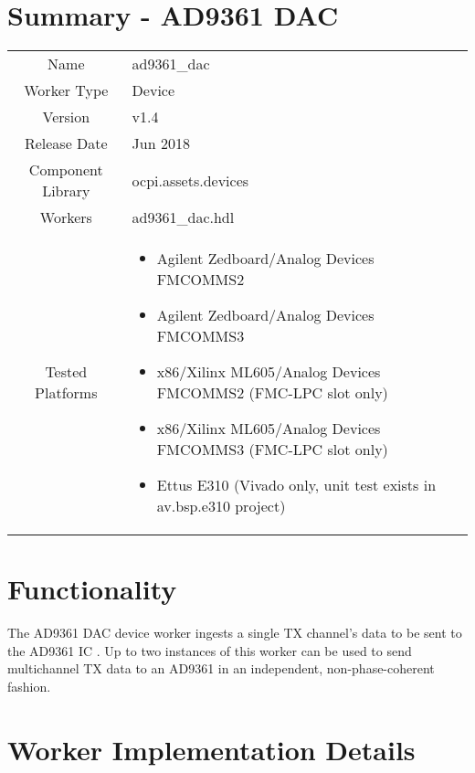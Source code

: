 \documentclass{article}
\author{} %
\date{Version \docVersion} %
\title{\docTitle}
\def\docVersion{1.4}
\def\comp{ad9361\_dac}
\def\Comp{AD9361 DAC}
\begin{document}
\section*{Summary - \Comp}
\begin{tabular}{|c|M{13.5cm}|}
	\hline
	                  &                  \\
	\hline
	Name              & \comp            \\
	\hline
	Worker Type       & Device           \\
	\hline
	Version           & v\docVersion     \\
	\hline
	Release Date      & Jun 2018         \\
	\hline
	Component Library & ocpi.assets.devices     \\
	\hline
	Workers           & \comp.hdl        \\
	\hline
	Tested Platforms  &
\begin{itemize}
  \item Agilent Zedboard/Analog Devices FMCOMMS2
  \item Agilent Zedboard/Analog Devices FMCOMMS3
  \item x86/Xilinx ML605/Analog Devices FMCOMMS2 (FMC-LPC slot only)
  \item x86/Xilinx ML605/Analog Devices FMCOMMS3 (FMC-LPC slot only)
  \item Ettus E310 (Vivado only, unit test exists in av.bsp.e310 project)
\end{itemize} \\
	\hline
\end{tabular}

\section*{Functionality}
	The \Comp{} device worker ingests a single TX channel's data to be sent to the AD9361 IC \cite{ad9361}. Up to two instances of this worker can be used to send multichannel TX data to an AD9361 in an independent, non-phase-coherent fashion.
\section*{Worker Implementation Details}
\end{document}
